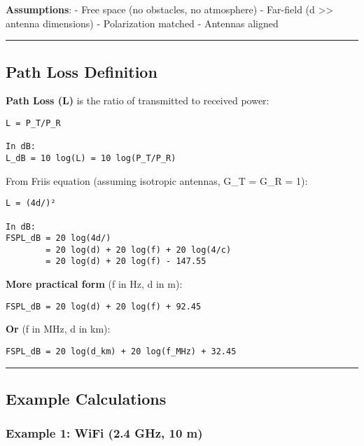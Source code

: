 \textbf{Assumptions}: - Free space (no obstacles, no atmosphere) -
Far-field (d \textgreater\textgreater{} antenna dimensions) -
Polarization matched - Antennas aligned

\begin{center}\rule{0.5\linewidth}{0.5pt}\end{center}

\subsection{\texorpdfstring{ Path Loss
Definition}{ Path Loss Definition}}\label{path-loss-definition}

\textbf{Path Loss (L)} is the ratio of transmitted to received power:

\begin{verbatim}
L = P_T/P_R

In dB:
L_dB = 10 log(L) = 10 log(P_T/P_R)
\end{verbatim}

From Friis equation (assuming isotropic antennas, G\_T = G\_R = 1):

\begin{verbatim}
L = (4d/)²

In dB:
FSPL_dB = 20 log(4d/)
        = 20 log(d) + 20 log(f) + 20 log(4/c)
        = 20 log(d) + 20 log(f) - 147.55
\end{verbatim}

\textbf{More practical form} (f in Hz, d in m):

\begin{verbatim}
FSPL_dB = 20 log(d) + 20 log(f) + 92.45
\end{verbatim}

\textbf{Or} (f in MHz, d in km):

\begin{verbatim}
FSPL_dB = 20 log(d_km) + 20 log(f_MHz) + 32.45
\end{verbatim}

\begin{center}\rule{0.5\linewidth}{0.5pt}\end{center}

\subsection{\texorpdfstring{ Example
Calculations}{ Example Calculations}}\label{example-calculations}

\subsubsection{Example 1: WiFi (2.4 GHz, 10
m)}\label{example-1-wifi-2.4-ghz-10-m}

